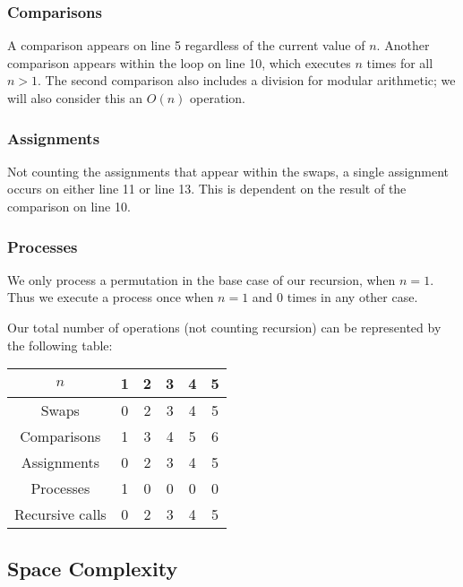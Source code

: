 \documentclass[11pt, oneside]{article}   	%
\begin{document}
\subsubsection{Comparisons}

A comparison appears on line 5 regardless of the current value of $n$. Another comparison appears within the loop on line 10, which executes $n$ times for all $n > 1$. The second comparison also includes a division for modular arithmetic; we will also consider this an $O(n)$ operation.

\subsubsection{Assignments}

Not counting the assignments that appear within the swaps, a single assignment occurs on either line 11 or line 13. This is dependent on the result of the comparison on line 10.

\subsubsection{Processes}

We only process a permutation in the base case of our recursion, when $n = 1$. Thus we execute a process once when $n = 1$ and 0 times in any other case.

Our total number of operations (not counting recursion) can be represented by the following table:

\begin{center}
\begin{tabular}{|c|c|c|c|c|c|}
	\hline
	$n$ & 1 & 2 & 3 & 4 & 5 \\
	\hline
	Swaps & 0 & 2 & 3 & 4 & 5 \\
	\hline
	Comparisons & 1 & 3 & 4 & 5 & 6 \\
	\hline
	Assignments & 0 & 2 & 3 & 4 & 5 \\
	\hline
	Processes & 1 & 0 & 0 & 0 & 0 \\
	\hline
	Recursive calls & 0 & 2 & 3 & 4 & 5 \\
	\hline
\end{tabular}
\end{center}

\subsection{Space Complexity}
\end{document}
